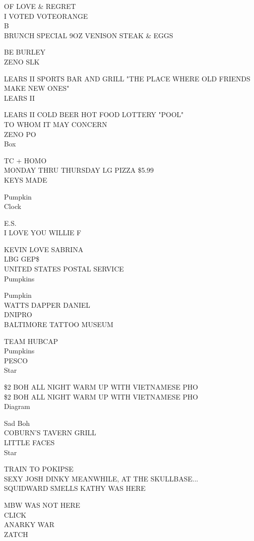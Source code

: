 \documentclass[10pt,letterpaper]{article}
\begin{document}
OF LOVE \& REGRET\\
I VOTED VOTEORANGE\\
B\\
BRUNCH SPECIAL 9OZ VENISON STEAK \& EGGS

BE BURLEY\\
ZENO SLK

LEARS II SPORTS BAR AND GRILL "THE PLACE WHERE OLD FRIENDS MAKE NEW ONES"\\
LEARS II

LEARS II COLD BEER HOT FOOD LOTTERY "POOL"\\
TO WHOM IT MAY CONCERN\\
ZENO PO\\
Box

TC + HOMO\\
MONDAY THRU THURSDAY LG PIZZA \$5.99\\
KEYS MADE

Pumpkin\\
Clock

E.S.\\
I LOVE YOU WILLIE F

KEVIN LOVE SABRINA\\
LBG GEP\$\\
UNITED STATES POSTAL SERVICE\\
Pumpkins

Pumpkin\\
WATTS DAPPER DANIEL\\
DNIPRO\\
BALTIMORE TATTOO MUSEUM

TEAM HUBCAP\\
Pumpkins\\
PESCO\\
Star

\$2 BOH ALL NIGHT WARM UP WITH VIETNAMESE PHO\\
\$2 BOH ALL NIGHT WARM UP WITH VIETNAMESE PHO\\
Diagram

Sad Boh\\
COBURN'S TAVERN GRILL\\
LITTLE FACES\\
Star

TRAIN TO POKIPSE\\
SEXY JOSH DINKY MEANWHILE, AT THE SKULLBASE...\\
SQUIDWARD SMELLS KATHY WAS HERE

MBW WAS NOT HERE\\
CLICK\\
ANARKY WAR\\
ZATCH
\end{document}
